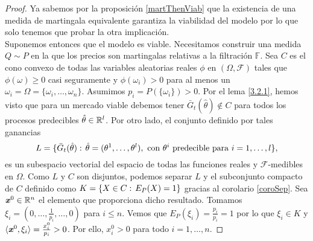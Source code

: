 \begin{proof}
	Ya sabemos por la proposición \ref{martThenViab} que la existencia de una medida de martingala equivalente garantiza la viabilidad del modelo por lo que solo tenemos que probar la otra implicación. \\
	
	Suponemos entonces que el modelo es viable. Necesitamos construir una medida $ Q \sim P $ en la que los precios son martingalas relativas a la filtración $ \mathbb{F} $. Sea $ C $ es el cono convexo de todas las variables aleatorias reales $ \phi $ en $ (\Omega, \mathcal{F}) $ tales que $ \phi(\omega) \geq 0 $ casi seguramente y $ \phi(\omega_i) > 0 $ para al menos un $ \omega_i = \Omega = \{\omega_i,\dots, \omega_n \} $. Asumimos $ p_i = P(\{\omega_i\}) > 0 $. Por el lema \ref{3.2.1}, hemos visto que para un mercado viable debemos tener $ \bar{G}_t(\hat{\theta}) \notin C$ para todos los procesos predecibles $ \hat{\theta} \in  \mathbb{R}^l $. Por otro lado, el conjunto definido por tales ganancias 
	\[
	L = \{\bar{G}_t(\hat{\theta}):\hspace{0.5mm} \hat{\theta}=(\theta^1,\dots,\theta^l),\text{ con } \theta^i \text{ predecible para } i=1,\dots,l \},
	\]
	es un subespacio vectorial del espacio de todas las funciones reales y  $ \mathcal{F} $-medibles en $ \Omega $. Como $ L $ y $ C $ son disjuntos, podemos separar $ L $ y el subconjunto compacto de $ C $ definido como $ K =\{X\in C: \hspace{0.5mm} E_P(X) = 1\} $ gracias al corolario \ref{coroSep}. Sea $ \textbf{\emph{x}}^0 \in \mathbb{R}^n $ el elemento que proporciona dicho resultado. Tomamos $ \xi_i = (0,\dots,\frac{1}{p_i},\dots,0) $ para $ i \leq n $. Vemos que $ E_P(\xi_i) = \frac{p_i}{p_i} = 1$ por lo que $ \xi_i \in K $ y $ \langle \textbf{\emph{x}}^0, \xi_i \rangle = \frac{x^0_i}{p_i} > 0$. Por ello, $ x^0_i > 0$ para todo $ i=1,\dots,n $.
	

\end{proof}
